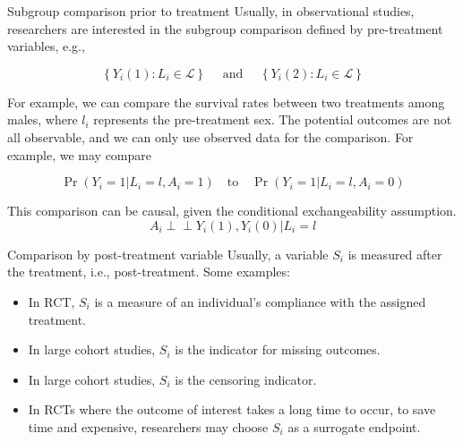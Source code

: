 \documentclass[10pt]{beamer}
\begin{document}
\begin{frame}{Subgroup comparison prior to treatment}
 Usually, in observational studies, researchers are interested in the subgroup comparison defined by pre-treatment variables, e.g., 

$$
\left\{Y_i(1): L_i \in \mathcal{L}\right\} \quad \text { and } \quad\left\{Y_i(2): L_i \in \mathcal{L}\right\}
$$

\noindent For example, we can compare the survival rates between two treatments among males, where $l_i$ represents the pre-treatment sex. The potential outcomes are not all observable, and we can only use observed data for the comparison. For example, we may compare

$$
\Pr(Y_i = 1|L_i = l, A_i = 1) \quad \text{to} \quad \Pr(Y_i = 1|L_i = l, A_i = 0) 
$$

This comparison can be causal, given the conditional exchangeability assumption. 
$$A_i\perp\!\!\!\perp Y_i(1), Y_i(0)|L_i = l$$
    
\end{frame}

\begin{frame}{Comparison by post-treatment variable}
Usually, a variable $S_i$ is measured after the treatment, i.e., post-treatment. Some examples:

\begin{itemize}
    \item In RCT, $S_i$ is a measure of an individual's compliance with the assigned treatment.
    \item In large cohort studies, $S_i$ is the indicator for missing outcomes.
    \item In large cohort studies, $S_i$ is the censoring indicator.
    \item In RCTs where the outcome of interest takes a long time to occur, to save time and expensive, researchers may choose $S_i$ as a surrogate endpoint.
\end{itemize}
\end{frame}
\end{document}
